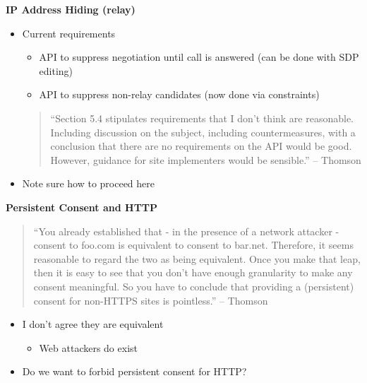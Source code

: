 \documentclass[helvetica]{seminar}
\newcommand{\heading}[1]{%
  \begin{center} 
    \large\bf 
    #1 
  \end{center} 
  \vspace{.4 in}}
\begin{document}
\begin{slide}
\heading{IP Address Hiding (relay)}

\begin{itemize}
\item Current requirements
  \begin{itemize}
  \item API to suppress negotiation until call is answered (can be done with SDP editing)
  \item API to suppress non-relay candidates (now done via constraints)
  \end{itemize}

{\footnotesize
  \begin{quote}
``Section 5.4 stipulates requirements that I don't think are reasonable.
 Including discussion on the subject, including countermeasures, with
a conclusion that there are no requirements on the API would be good.
However, guidance for site implementers would be sensible.'' -- Thomson
\end{quote}
}
\end{itemize}

\begin{itemize}
\item Note sure how to proceed here
\end{itemize}
\end{slide}



\begin{slide}
\heading{Persistent Consent and HTTP}

{\footnotesize
  \begin{quote}
``You already established that - in the presence of a network attacker -
consent to foo.com is equivalent to consent to bar.net.  Therefore, it
seems reasonable to regard the two as being equivalent.  Once you make
that leap, then it is easy to see that you don't have enough
granularity to make any consent meaningful.  So you have to conclude
that providing a (persistent) consent for non-HTTPS sites is
pointless.'' -- Thomson
\end{quote}
}

\begin{itemize}
\item I don't agree they are equivalent
  \begin{itemize}
  \item Web attackers do exist
  \end{itemize}

\item Do we want to forbid persistent consent for HTTP?
\end{itemize}
\end{slide}
\end{document}
